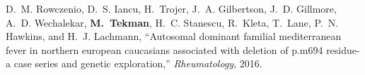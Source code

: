 \begin{thebibliography}{10}
\BIBentryALTinterwordspacing
D.~M. Rowczenio, D.~S. Iancu, H.~Trojer, J.~A. Gilbertson, J.~D. Gillmore,
  A.~D. Wechalekar, \textbf{M.~Tekman}, H.~C. Stanescu, R.~Kleta, T.~Lane, P.~N.
  Hawkins, and H.~J. Lachmann, ``Autosomal dominant familial mediterranean
  fever in northern european caucasians associated with deletion of p.m694
  residue-a case series and genetic exploration,'' \emph{Rheumatology}, 2016.
\BIBentrySTDinterwordspacing

\end{thebibliography}
\endgroup

\pagebreak
